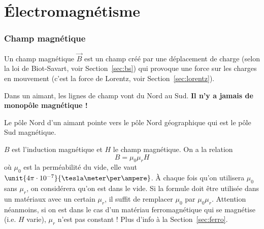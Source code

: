 

\usepackage{amsfonts}
\usepackage{amsmath}
\usepackage[squaren, Gray]{SIunits}
\usepackage{numprint}
\usepackage{esint}
\usepackage{esvect}
\usepackage{pgfplots}
\usepackage{circuitikz}
\usepackage{subcaption}
\usepackage{appendix}

\newtheorem{defin}{Definition}[section]
\newtheorem{nota}[defin]{Notation}
\newtheorem{prop}[defin]{Propriete}

\newcommand{\B}{\vec B}
\newcommand{\E}{\vec E}
\newcommand{\EMF}{\mathcal{E}}

\DeclareMathOperator{\newdiv}{div}
\DeclareMathOperator{\diff}{d}

\newcommand{\dif}{\diff\!}

\setlength{\parindent}{0em} %
\setlength{\parskip}{0.6em} %


\part{Électromagnétisme}

\section{Champ magnétique}
Un champ magnétique $\B$ est un champ créé par une déplacement de charge (selon la loi de Biot-Savart, voir Section~\ref{sec:bs})
qui provoque une force sur les charges en mouvement (c'est la force de Lorentz, voir Section~\ref{sec:lorentz}).

Dans un aimant, les lignes de champ vont du Nord au Sud.
{\bf Il n'y a jamais de monopôle magnétique !}

Le pôle Nord d'un aimant pointe vers le pôle Nord géographique qui est le pôle Sud magnétique.

$B$ est l'induction magnétique et $H$ le champ magnétique.
On a la relation
\[ B = \mu_0\mu_rH \]
où $\mu_0$ est la perméabilité du vide, elle vaut $\unit{4\pi \cdot 10^{-7}}{\tesla\meter\per\ampere}$.
À chaque fois qu'on utilisera $\mu_0$ sans $\mu_r$, on considérera qu'on est dans le vide.
Si la formule doit être utilisée dans un matériaux avec un certain $\mu_r$,
il suffit de remplacer $\mu_0$ par $\mu_0\mu_r$.
Attention néanmoins, si on est dans le cas d'un matériau ferromagnétique qui se magnétise (i.e. $H$ varie), $\mu_r$ n'est pas constant !
Plus d'info à la Section~\ref{sec:ferro}.

